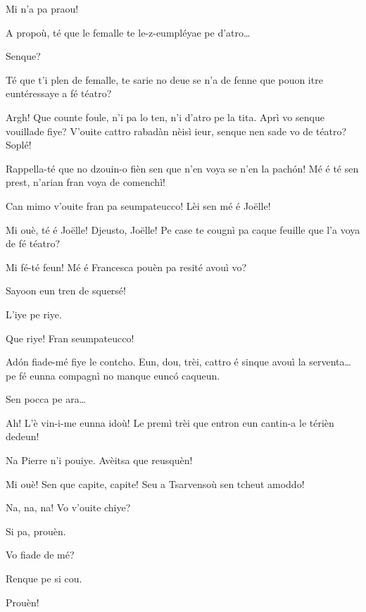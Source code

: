 \begin{drama}
\Joelspeaks Mi n'a pa praou!

\Pierrespeaks{} A propoù, té que le femalle te le-z-eumpléyae pe d'atro\ldots

\Vetchotspeaks  Senque?

\Pierrespeaks{} Té que t'i plen de femalle, te sarie no deue se n'a de fenne que pouon itre euntéressaye a fé téatro?

\Vetchotspeaks  Argh! Que counte foule, n'i pa lo ten, n'i d’atro pe la tita. Aprì vo senque vouillade fiye? V'ouite cattro rabadàn nèisì ieur, senque nen sade vo de téatro? Soplé!
 
\Joelspeaks  Rappella-té que no dzouin-o fièn sen que n'en voya se n'en la pach\'on!  Mé é té sen prest, n'arian fran voya de comenchì!

\Francescaspeaks Can mimo v'ouite fran pa seumpateucco! Lèi sen mé é Jo\"{e}lle! 

\Pierrespeaks  Mi ouè, té é Jo\"{e}lle! Djeusto, Jo\"{e}lle! Pe case te cougnì pa caque feuille que l'a voya de fé téatro?
 
\Joellespeaks {} Mi fé-té feun! Mé é Francesca pouèn pa resité avouì vo?
  
\Joelspeaks Sayoon eun tren de squersé!

\Pierrespeaks L'iye pe riye.

\Francescaspeaks{} Que riye!
\Joellespeaks{} Fran seumpateucco! 

\Pierrespeaks Ad\'on fiade-mé fiye le contcho.  Eun, dou, trèi, cattro é sinque avouì la serventa\ldots pe fé eunna compagnì no manque euncó caqueun.

\Joelspeaks Sen pocca pe ara\ldots

\Pierrespeaks  Ah! L'è vin-i-me eunna idoù! Le premì trèi que entron eun cantin-a le térièn dedeun!

\Joelspeaks Na Pierre n'i pouiye. Avèitsa que reusquèn!

\Pierrespeaks Mi ouè! Sen que capite, capite! Seu a Tsarvensoù sen tcheut amod\-do!

\Joelspeaks Na, na, na!  Vo v'ouite chiye?

\Joellespeaks Si pa, prouèn.

\Pierrespeaks{} Vo fiade de mé?

\Francescaspeaks Renque pe si cou.

\Joelspeaks Prouèn!


\end{drama}
